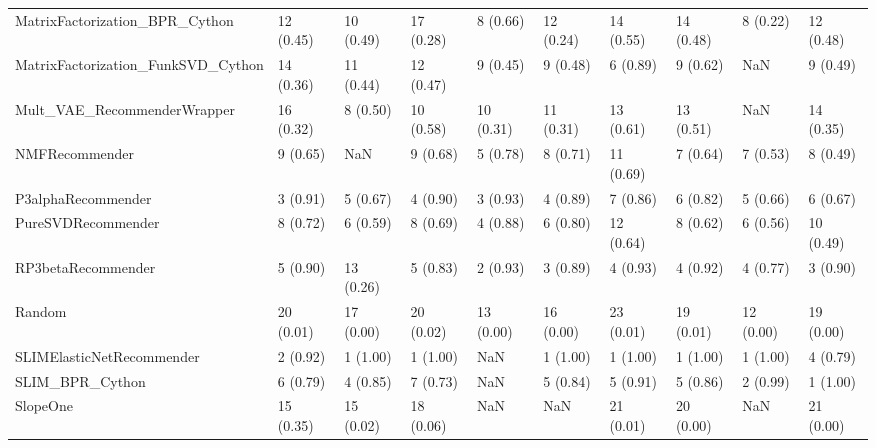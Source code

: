 \begin{tabular}{llllllllll}
     MatrixFactorization\_BPR\_Cython &                12 (0.45) &   10 (0.49) &     17 (0.28) &     8 (0.66) &            12 (0.24) &           14 (0.55) &         14 (0.48) &           8 (0.22) &         12 (0.48) \\
 MatrixFactorization\_FunkSVD\_Cython &                14 (0.36) &   11 (0.44) &     12 (0.47) &     9 (0.45) &             9 (0.48) &            6 (0.89) &          9 (0.62) &                NaN &          9 (0.49) \\
        Mult\_VAE\_RecommenderWrapper &                16 (0.32) &    8 (0.50) &     10 (0.58) &    10 (0.31) &            11 (0.31) &           13 (0.61) &         13 (0.51) &                NaN &         14 (0.35) \\
                     NMFRecommender &                 9 (0.65) &         NaN &      9 (0.68) &     5 (0.78) &             8 (0.71) &           11 (0.69) &          7 (0.64) &           7 (0.53) &          8 (0.49) \\
                 P3alphaRecommender &                 3 (0.91) &    5 (0.67) &      4 (0.90) &     3 (0.93) &             4 (0.89) &            7 (0.86) &          6 (0.82) &           5 (0.66) &          6 (0.67) \\
                 PureSVDRecommender &                 8 (0.72) &    6 (0.59) &      8 (0.69) &     4 (0.88) &             6 (0.80) &           12 (0.64) &          8 (0.62) &           6 (0.56) &         10 (0.49) \\
                 RP3betaRecommender &                 5 (0.90) &   13 (0.26) &      5 (0.83) &     2 (0.93) &             3 (0.89) &            4 (0.93) &          4 (0.92) &           4 (0.77) &          3 (0.90) \\
                             Random &                20 (0.01) &   17 (0.00) &     20 (0.02) &    13 (0.00) &            16 (0.00) &           23 (0.01) &         19 (0.01) &          12 (0.00) &         19 (0.00) \\
          SLIMElasticNetRecommender &                 2 (0.92) &    1 (1.00) &      1 (1.00) &          NaN &             1 (1.00) &            1 (1.00) &          1 (1.00) &           1 (1.00) &          4 (0.79) \\
                    SLIM\_BPR\_Cython &                 6 (0.79) &    4 (0.85) &      7 (0.73) &          NaN &             5 (0.84) &            5 (0.91) &          5 (0.86) &           2 (0.99) &          1 (1.00) \\
                           SlopeOne &                15 (0.35) &   15 (0.02) &     18 (0.06) &          NaN &                  NaN &           21 (0.01) &         20 (0.00) &                NaN &         21 (0.00) \\

\end{tabular}
